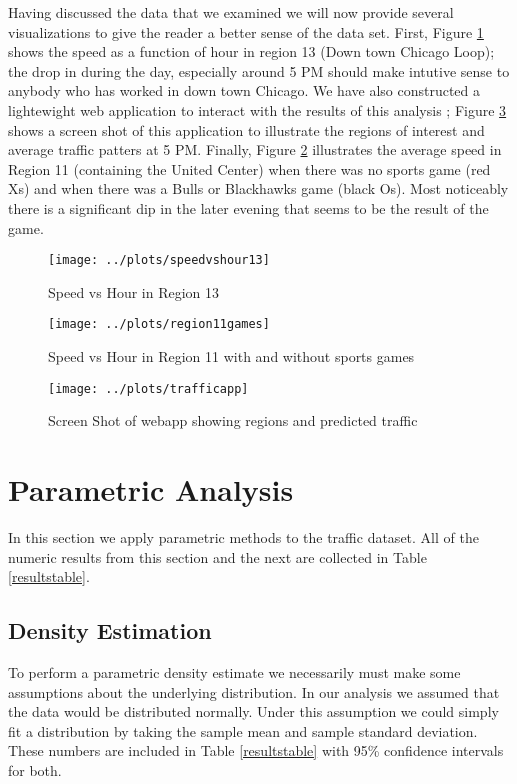 \documentclass[12pt]{article}
\begin{document}
Having discussed the data that we examined we will now provide several visualizations to give the reader a better sense of the data set. First, Figure \ref{speedvshour13} shows the speed as a function of hour in region 13 (Down town Chicago Loop); the drop in during the day, especially around 5 PM should make intutive sense to anybody who has worked in down town Chicago. We have also constructed a lightewight web application to interact with the results of this analysis \cite{trafficapp}; Figure \ref{appscreenshot} shows a screen shot of this application to illustrate the regions of interest and average traffic patters at 5 PM. Finally, Figure \ref{region11games} illustrates the average speed in Region 11 (containing the United Center) when there was no sports game (red Xs) and when there was a Bulls or Blackhawks game (black Os). Most noticeably there is a significant dip in the later evening that seems to be the result of the game.

\begin{figure}[!ht]
\centering
\texttt{[image: ../plots/speedvshour13]}
\caption{Speed vs Hour in Region 13}
\label{speedvshour13}
\end{figure}

\begin{figure}[!ht]
\centering
\texttt{[image: ../plots/region11games]}
\caption{Speed vs Hour in Region 11 with and without sports games}
\label{region11games}
\end{figure}

\begin{figure}[!ht]
\centering
\texttt{[image: ../plots/trafficapp]}
\caption{Screen Shot of webapp showing regions and predicted traffic}
\label{appscreenshot}
\end{figure}
\section{Parametric Analysis}
In this section we apply parametric methods to the traffic dataset. All of the numeric results from this section and the next are collected in Table \ref{resultstable}.
\subsection{Density Estimation}
To perform a parametric density estimate we necessarily must make some assumptions about the underlying distribution. In our analysis we assumed that the data would be distributed normally. Under this assumption we could simply fit a distribution by taking the sample mean and sample standard deviation. These numbers are included in Table \ref{resultstable} with 95\% confidence intervals for both.
\end{document}
